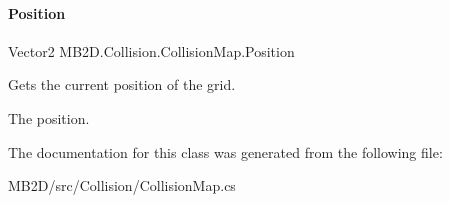 \paragraph{\texorpdfstring{Position}{Position}}
{\footnotesize\ttfamily Vector2 M\+B2\+D.\+Collision.\+Collision\+Map.\+Position\hspace{0.3cm}{\ttfamily [get]}}



Gets the current position of the grid. 

The position.

The documentation for this class was generated from the following file\+:\begin{DoxyCompactItemize}
\item 
M\+B2\+D/src/\+Collision/Collision\+Map.\+cs\end{DoxyCompactItemize}
